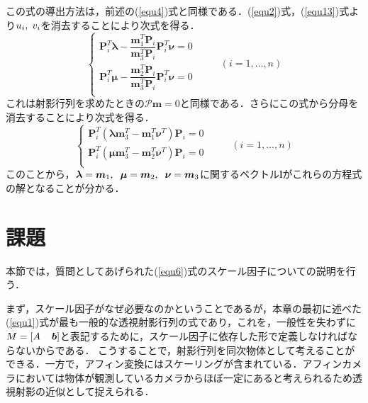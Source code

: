 \documentclass[a4paper,10pt]{jarticle}
\begin{document}
%
この式の導出方法は，前述の(\ref{equ4})式と同様である．(\ref{equ2})式，(\ref{equ13})式より$ u_i, \hspace{1mm} v_i $を消去することにより次式を得る．
%
\begin{equation}
 \left\{
  \begin{array}{l}
   {\bm P}^T_i {\bm \lambda} - \dfrac{{\bm m}^T_1 {\bm P}_i}{{\bm m}^T_3 {\bm P}_i} {\bm P}^T_i {\bm \nu} = 0 \\
   {\bm P}^T_i {\bm \mu} - \dfrac{{\bm m}^T_2 {\bm P}_i}{{\bm m}^T_3 {\bm P}_i} {\bm P}^T_i {\bm \nu} = 0 \\
  \end{array}
 \right. \hspace{1cm} (i = 1, \ldots ,n)
\label{equ14}
\end{equation}
%
これは射影行列を求めたときの$ \mathcal P {\bm m} = 0 $と同様である．さらにこの式から分母を消去することにより次式を得る．
%
\begin{equation}
 \left\{
  \begin{array}{l}
   {\bm P}^T_i ( {\bm \lambda} {\bm m}^T_3 - {\bm m}^T_1 {\bm \nu}^T ) {\bm P}_i = 0 \\
   {\bm P}^T_i ( {\bm \mu} {\bm m}^T_3 - {\bm m}^T_2 {\bm \nu}^T ) {\bm P}_i = 0\\
  \end{array}
 \right. \hspace{1cm} (i = 1, \ldots ,n)
\label{equ15}
\end{equation}
%
このことから，$ {\bm \lambda} = {\bm m}_1, \hspace{2mm} {\bm \mu} = {\bm m}_2, \hspace{2mm} {\bm \nu} = {\bm m}_3 $に関するベクトル$ {\bm l} $がこれらの方程式の解となることが分かる．
%


\section{課題}
\label{assignment}
本節では，質問としてあげられた(\ref{equ6})式のスケール因子についての説明を行う．


まず，スケール因子がなぜ必要なのかということであるが，本章の最初に述べた(\ref{equ1})式が最も一般的な透視射影行列の式であり，これを，一般性を失わずに$ M = [ A \hspace{4mm} {\bm b} ] $と表記するために，スケール因子に依存した形で定義しなければならないからである．
こうすることで，射影行列を同次物体として考えることができる．一方で，アフィン変換にはスケーリングが含まれている．アフィンカメラにおいては物体が観測しているカメラからほぼ一定にあると考えられるため透視射影の近似として捉えられる．
\end{document}
